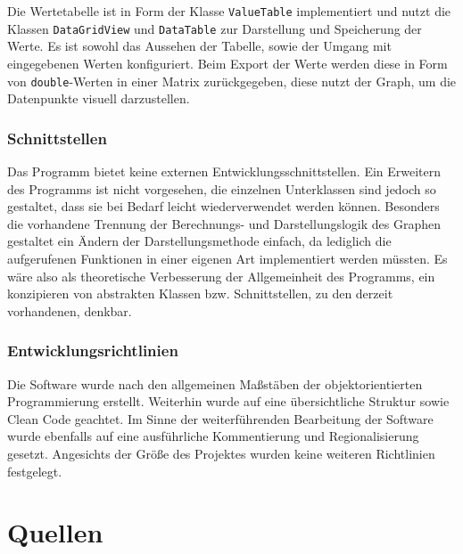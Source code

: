 \documentclass[a4paper]{article}
\begin{document}
    Die Wertetabelle ist in Form der Klasse \verb|ValueTable| implementiert und nutzt die Klassen \verb|DataGridView| und \verb|DataTable| zur Darstellung und Speicherung der Werte.
    Es ist sowohl das Aussehen der Tabelle, sowie der Umgang mit eingegebenen Werten konfiguriert.
    Beim Export der Werte werden diese in Form von \verb|double|-Werten in einer Matrix zurückgegeben, diese nutzt der Graph, um die Datenpunkte visuell darzustellen.

    \subsubsection{Schnittstellen}

    Das Programm bietet keine externen Entwicklungsschnittstellen.
    Ein Erweitern des Programms ist nicht vorgesehen, die einzelnen Unterklassen sind jedoch so gestaltet, dass sie bei Bedarf leicht wiederverwendet werden können.
    Besonders die vorhandene Trennung der Berechnungs- und Darstellungslogik des Graphen gestaltet ein Ändern der Darstellungsmethode einfach, da lediglich die aufgerufenen Funktionen in einer eigenen Art implementiert werden müssten.
    Es wäre also als theoretische Verbesserung der Allgemeinheit des Programms, ein konzipieren von abstrakten Klassen bzw. Schnittstellen, zu den derzeit vorhandenen, denkbar.

    \subsubsection{Entwicklungsrichtlinien}
    
    Die Software wurde nach den allgemeinen Maßstäben der objektorientierten Programmierung erstellt.
    Weiterhin wurde auf eine übersichtliche Struktur sowie Clean Code geachtet.
    Im Sinne der weiterführenden Bearbeitung der Software wurde ebenfalls auf eine ausführliche Kommentierung und Regionalisierung gesetzt.
    Angesichts der Größe des Projektes wurden keine weiteren Richtlinien festgelegt.

\newpage
\section{Quellen}
\end{document}
